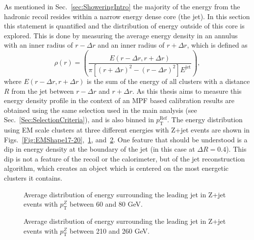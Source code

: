 As mentioned in Sec.~\ref{sec:ShoweringIntro} the majority of the energy from the hadronic recoil resides within a narrow energy dense core (the jet).  
In this section this statement is quantified and the distribution of energy outside of this core is explored.  
This is done by measuring the average energy density in an annulus with an inner radius of $r-\Delta r$ and an inner radius of $r+\Delta r$, which is defined as
\begin{equation}
  \rho\left(r\right)  = \left( \frac{ E\left(r-\Delta r, r+\Delta r\right)}{\pi \left[\left(r +\Delta r\right)^2-\left(r -\Delta r\right)^2\right] E^{\mathrm{jet}}}\right), 
\end{equation}
where $E\left(r-\Delta r, r+\Delta r\right)$ is the sum of the energy of all clusters with a distance $R$ from the jet between $r-\Delta r$ and  $r+\Delta r$.  
As this thesis aims to measure this energy density profile in the context of an MPF based calibration results are obtained using the same selection used in the main analysis (see Sec.~\ref{Sec:SelectionCriteria}), and is also binned in $p_{\mathrm T}^{\mathrm{Ref}}$.  
The energy distribution using EM scale clusters at three different energies with Z+jet events are shown in Figs.~\ref{Fig:EMShape17-20},~\ref{Fig:EMShape60-80}, and~\ref{Fig:EMShape210-260}.  
One feature that should be understood is a dip in energy density at the boundary of the jet (in this case at $\Delta R = 0.4$).  
This dip is not a feature of the recoil or the calorimeter, but of the jet reconstruction algorithm, which creates an object which is centered on the most energetic clusters it contains.  

\begin{figure}[!ht]
 \begin{center}
 \end{center}
 \caption[Recoil energy distribution in Z+jet, 60-80 GeV]
 {\small Average distribution of energy surrounding the leading jet in Z+jet events with $p_{\mathrm T}^{Z}$ between 60 and 80 GeV. }
 \label{Fig:EMShape60-80}
\end{figure}

\begin{figure}[!ht]
 \begin{center}
 \end{center}
 \caption[Recoil energy distribution in Z+jet, 210-260 GeV]
 {\small Average distribution of energy surrounding the leading jet in Z+jet events with $p_{\mathrm T}^{Z}$ between 210 and 260 GeV. }
 \label{Fig:EMShape210-260}
\end{figure}

